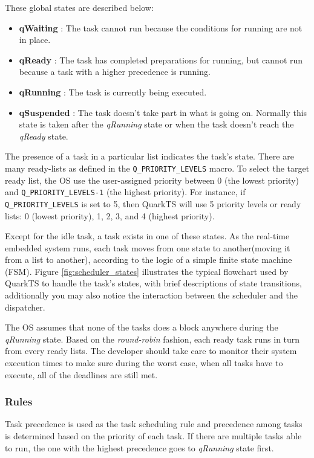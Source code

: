 These global states are described below:



\begin{itemize}
    \item \textbf{qWaiting} : The task cannot run because the conditions for running are not in place. 
    \item \textbf{qReady} : The task has completed preparations for running, but cannot run because a task with a higher precedence is running.
    \item \textbf{qRunning} : The task is currently being executed.
    \item \textbf{qSuspended} : The task doesn't take part in what is going on. Normally this state is taken after the \textit{qRunning} state or when the task doesn't reach the \textit{qReady} state.
\end{itemize}


The presence of a task in a particular list indicates the task's state. 
There are many ready-lists as defined in the \lstinline{Q_PRIORITY_LEVELS} macro.
To select the target ready list, the OS use the user-assigned priority between 0 (the lowest priority) and \lstinline{Q_PRIORITY_LEVELS-1} (the highest priority). For instance, if \lstinline{Q_PRIORITY_LEVELS} is set to 5, then QuarkTS will use 5 priority levels or ready lists: 0 (lowest priority), 1, 2, 3, and 4 (highest priority). 



Except for the idle task, a task exists in one of these states. As the real-time embedded system runs, each task moves from one state to another(moving it from a list to another), according to the logic of a simple finite state machine (FSM). Figure \ref{fig:scheduler_states} illustrates the typical flowchart used by QuarkTS to handle the task's states, with brief descriptions of state transitions, additionally you may also notice the interaction between the scheduler and the dispatcher.

The OS assumes that none of the tasks does a block anywhere during the \textit{qRunning} state. Based on the \textit{round-robin} fashion, each ready task runs in turn from every ready lists. The developer should take care to monitor their system execution times to make sure during the worst case, when all tasks have to execute, all of the deadlines are still met.


\subsubsection{Rules}
Task precedence is used as the task scheduling rule and precedence among tasks is determined based on the priority of each task. If there are multiple tasks able to run, the one with the highest precedence goes to \textit{qRunning} state first. 

